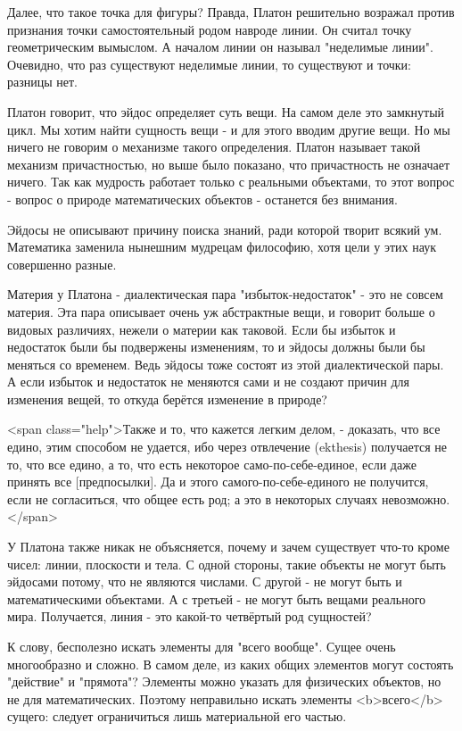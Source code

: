 \documentclass{article}
\begin{document}
Далее, что такое точка для фигуры? Правда, Платон решительно возражал против признания точки самостоятельный родом навроде линии. Он считал точку геометрическим вымыслом. А началом линии он называл "неделимые линии". Очевидно, что раз существуют неделимые линии, то существуют и точки: разницы нет.

Платон говорит, что эйдос определяет суть вещи. На самом деле это замкнутый цикл. Мы хотим найти сущность вещи - и для этого вводим другие вещи. Но мы ничего не говорим о механизме такого определения. Платон называет такой механизм причастностью, но выше было показано, что причастность не означает ничего. Так как мудрость работает только с реальными объектами, то этот вопрос - вопрос о природе математических объектов - останется без внимания.

Эйдосы не описывают причину поиска знаний, ради которой творит всякий ум. Математика заменила нынешним мудрецам философию, хотя цели у этих наук совершенно разные.

Материя у Платона - диалектическая пара "избыток-недостаток" - это не совсем материя. Эта пара описывает очень уж абстрактные вещи, и говорит больше о видовых различиях, нежели о материи как таковой. Если бы избыток и недостаток были бы подвержены изменениям, то и эйдосы должны были бы меняться со временем. Ведь эйдосы тоже состоят из этой диалектической пары. А если избыток и недостаток не меняются сами и не создают причин для изменения вещей, то откуда берётся изменение в природе?

\footnotemark[6]
<span class="help">Также и то, что кажется легким делом, - доказать, что все едино, этим способом не удается, ибо через отвлечение (ekthesis) получается не то, что все едино, а то, что есть некоторое само-по-себе-единое, если даже принять все [предпосылки]. Да и этого самого-по-себе-единого не получится, если не согласиться, что общее есть род; а это в некоторых случаях невозможно.</span>

У Платона также никак не объясняется, почему и зачем существует что-то кроме чисел: линии, плоскости и тела. С одной стороны, такие объекты не могут быть эйдосами потому, что не являются числами. С другой - не могут быть и математическими объектами.
\footnotemark[7]
А с третьей - не могут быть вещами реального мира. Получается, линия - это какой-то четвёртый род сущностей?

К слову, бесполезно искать элементы для "всего вообще". Сущее очень многообразно и сложно. В самом деле, из каких общих элементов могут состоять "действие" и "прямота"? Элементы можно указать для физических объектов, но не для математических. Поэтому неправильно искать элементы <b>всего</b> сущего: следует ограничиться лишь материальной его частью.
\end{document}
